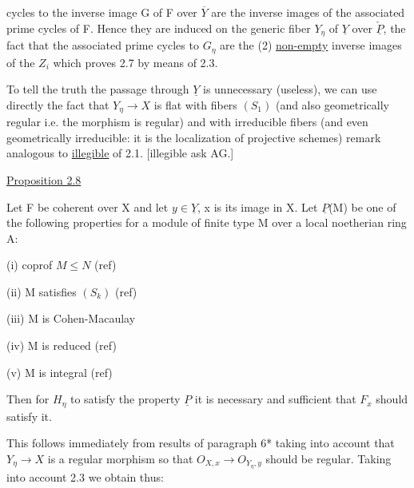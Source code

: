 
cycles to the inverse image G of F over $\overline{Y}$ are the inverse images
of the associated prime cycles of F.  Hence they are induced on
the generic fiber $Y_{\eta}$ of $\underline{Y}$ over $\check{\underline{P}}$, the fact that the associated
prime cycles to $G_{\eta}$ are the (2) \uline{non-empty} inverse images of the $Z_{i}$
which proves 2.7 by means of 2.3.

To tell the truth the passage through $\underline{Y}$ is unnecessary
(useless), we can use directly the fact that $Y_{\eta} \to X$ is flat with
fibers $(S_{1})$ (and also geometrically regular i.e. the morphism is
regular) and with irreducible fibers (and even geometrically
irreducible: it is the localization of projective schemes) remark
analogous to \uline{illegible} of 2.1.  [illegible ask AG.]

\uline{Proposition 2.8}

Let F be coherent over X and let $y \in \underline{Y}$, x is its image in X.
Let $\underline{P}$(M) be one of the following properties for a module of finite
type M over a local noetherian ring A:

(i) \quad coprof $M \leq N$ \qquad (ref)

(ii) \quad M satisfies $(S_{k})$ \qquad (ref)

(iii) \quad M is Cohen-Macaulay

(iv) \quad M is reduced \qquad (ref)

(v) \quad M is integral \qquad (ref)

Then for $H_{\eta}$ to satisfy the property $\underline{P}$ it is necessary and
sufficient that $F_{x}$ should satisfy it.

This follows immediately from results of paragraph 6* taking
into account that $Y_{\eta} \to X$ is a regular morphism so that
$O_{X,x} \to O_{Y_{\eta},y}$ should be regular.  Taking into account 2.3 we obtain
thus:
